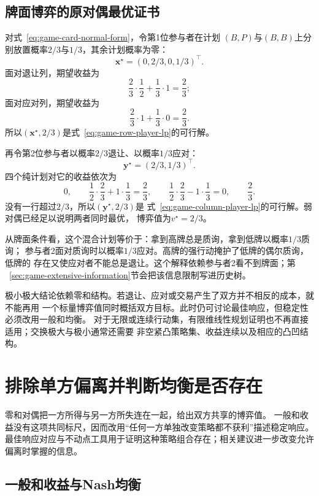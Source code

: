 \subsection{牌面博弈的原对偶最优证书}

对式~\eqref{eq:game-card-normal-form}，令第1位参与者在计划
\((B,P)\)与\((B,B)\)上分别放置概率\(2/3\)与\(1/3\)，其余计划概率为零：
\[
  \bm{x}^\star
  =
  (0,2/3,0,1/3)^{\top}.
\]
面对退让列，期望收益为
\[
  \frac23\cdot\frac12+\frac13\cdot1
  =
  \frac23;
\]
面对应对列，期望收益为
\[
  \frac23\cdot1+\frac13\cdot0
  =
  \frac23.
\]
所以\((\bm{x}^\star,2/3)\)是式~\eqref{eq:game-row-player-lp}的可行解。

再令第2位参与者以概率\(2/3\)退让、以概率\(1/3\)应对：
\[
  \bm{y}^\star=(2/3,1/3)^{\top}.
\]
四个纯计划对它的收益依次为
\[
  0,\qquad
  \frac12\cdot\frac23+1\cdot\frac13=\frac23,\qquad
  \frac12\cdot\frac23-1\cdot\frac13=0,\qquad
  \frac23.
\]
没有一行超过\(2/3\)，所以\((\bm{y}^\star,2/3)\)是
式~\eqref{eq:game-column-player-lp}的可行解。弱对偶已经足以说明两者同时最优，
博弈值为\(v^\star=2/3\)。

从牌面条件看，这个混合计划等价于：拿到高牌总是质询，拿到低牌以概率\(1/3\)质询；
参与者2面对质询时以概率\(1/3\)应对。高牌的强行动掩护了低牌的偶尔质询，低牌的
存在又使应对者不能总是退让。这个解释依赖参与者2看不到牌面；第
~\ref{sec:game-extensive-information}节会把该信息限制写进历史树。

极小极大结论依赖零和结构。若退让、应对或交易产生了双方并不相反的成本，就不能再用
一个标量博弈值同时概括双方目标。此时仍可讨论最佳响应，但稳定性必须改用一般和均衡。
对于无限或连续行动集，有限维线性规划证明也不再直接适用；交换极大与极小通常还需要
非空紧凸策略集、收益连续以及相应的凸凹结构。

\section{排除单方偏离并判断均衡是否存在}
\label{sec:game-best-response-equilibrium}

零和对偶把一方所得与另一方所失连在一起，给出双方共享的博弈值。
一般和收益没有这项共同标尺，因而改用“任何一方单独改变策略都不获利”描述稳定响应。
最佳响应对应与不动点工具用于证明这种策略组合存在；相关建议进一步改变允许偏离时掌握的信息。

\subsection{一般和收益与Nash均衡}

